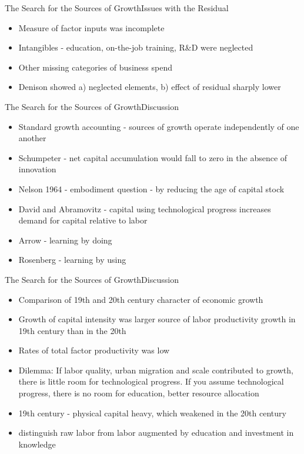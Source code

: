 \documentclass{beamer}
\begin{document}
\begin{frame}{The Search for the Sources of Growth}{Issues with the Residual}
\begin{itemize}
\item{Measure of factor inputs was incomplete}
\item{Intangibles - education, on-the-job training, R\&D were neglected}
\item{Other missing categories of business spend}
\item{Denison showed a) neglected elements, b) effect of residual sharply lower}
\end{itemize}
\end{frame}


\begin{frame}{The Search for the Sources of Growth}{Discussion}
\begin{itemize}
\item{Standard growth accounting - sources of growth operate independently of one another}
\item{Schumpeter - net capital accumulation would fall to zero in the absence of innovation}
\item{Nelson 1964 - embodiment question - by reducing the age of capital stock}
\item{David and Abramovitz - capital using technological progress increases demand for capital relative to labor}
\item{Arrow - learning by doing}
\item{Rosenberg - learning by using}
\end{itemize}
\end{frame}


\begin{frame}{The Search for the Sources of Growth}{Discussion}
\begin{itemize}
\item{Comparison of 19th and 20th century character of economic growth}
\item{Growth of capital intensity was larger source of labor productivity growth in 19th century than in the 20th}
\item{Rates of total factor productivity was low}
\item{Dilemma: If labor quality, urban migration and scale contributed to growth, there is little room for technological progress. If you assume technological progress, there is no room for education, better resource allocation}
\item{19th century - physical capital heavy, which weakened in the 20th century}
\item{distinguish raw labor from labor augmented by education and investment in knowledge}
\end{itemize}
\end{frame}
\end{document}
